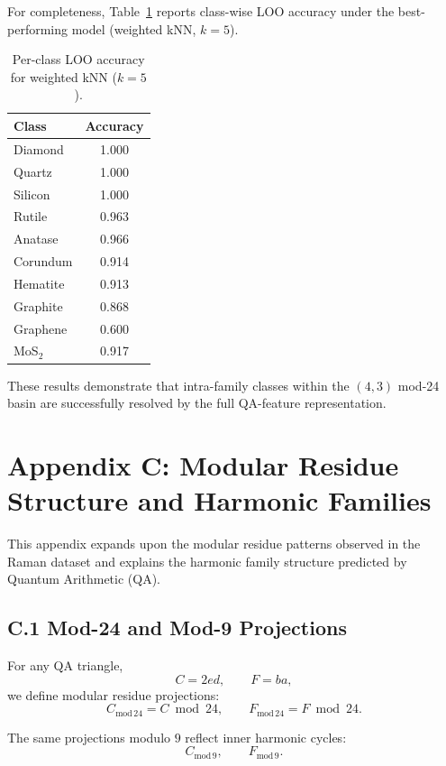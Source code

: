 \documentclass[12pt]{article}
\begin{document}
For completeness, Table~\ref{tab:perclassB} reports class-wise LOO accuracy under the best-performing model
(weighted kNN, $k=5$).

\begin{table}[h!]
\centering
\caption{Per-class LOO accuracy for weighted kNN ($k=5$).}
\label{tab:perclassB}
\begin{tabular}{lc}
\hline
\textbf{Class} & \textbf{Accuracy} \\
\hline
Diamond & 1.000 \\
Quartz & 1.000 \\
Silicon & 1.000 \\
Rutile & 0.963 \\
Anatase & 0.966 \\
Corundum & 0.914 \\
Hematite & 0.913 \\
Graphite & 0.868 \\
Graphene & 0.600 \\
MoS$_2$ & 0.917 \\
\hline
\end{tabular}
\end{table}

These results demonstrate that intra-family classes within the $(4,3)$ mod-24 basin are successfully
resolved by the full QA-feature representation.

\section*{Appendix C: Modular Residue Structure and Harmonic Families}

This appendix expands upon the modular residue patterns observed in the Raman dataset and explains the
harmonic family structure predicted by Quantum Arithmetic (QA).

\subsection*{C.1 Mod-24 and Mod-9 Projections}

For any QA triangle,
\[
C = 2ed, \qquad F = ba,
\]
we define modular residue projections:
\[
C_{\mathrm{mod}\,24} = C \bmod 24, \qquad
F_{\mathrm{mod}\,24} = F \bmod 24.
\]

The same projections modulo $9$ reflect inner harmonic cycles:
\[
C_{\mathrm{mod}\,9},\qquad F_{\mathrm{mod}\,9}.
\]
\end{document}
